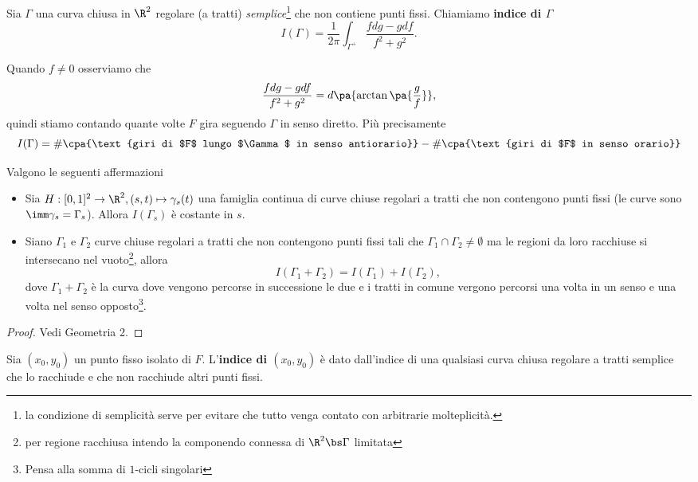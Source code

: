 \begin{definition}
Sia $\Gamma$ una curva chiusa in $\R^2$ regolare (a tratti) \textit{semplice}\footnote{la condizione di semplicit\`a serve per evitare che tutto venga contato con arbitrarie molteplicit\`a.} che non contiene punti fissi. Chiamiamo \textbf{indice di $\Gamma$}
\[I(\Gamma)=\frac1{2\pi}\int_{\Gamma^+}\frac{fdg-gdf}{f^2+g^2}.\]
\end{definition}
\begin{remark}
Quando $f\neq 0$ osserviamo che
\[\frac{fdg-gdf}{f^2+g^2}=d\pa{\arctan\pa{\frac gf}},\]
quindi stiamo contando quante volte $F$ gira seguendo $\Gamma$ in senso diretto. Pi\`u precisamente
\[I(\Gamma)=\#\cpa{\text{giri di $F$ lungo $\Gamma$ in senso antiorario}}-\#\cpa{\text{giri di $F$ in senso orario}}\]
\end{remark}


\setlength{\leftmargini}{0.5cm}
\begin{proposition}\label{ProprietaIndice}
Valgono le seguenti affermazioni
\begin{itemize}
\item Sia $H:[0,1]^2\to \R^2, (s,t)\mapsto \gamma_s(t)$ una famiglia continua di curve chiuse regolari a tratti che non contengono punti fissi (le curve sono $\imm\gamma_s=\Gamma_s$). Allora $I(\Gamma_s)$ \`e costante in $s$.
\item Siano $\Gamma_1$ e $\Gamma_2$ curve chiuse regolari a tratti che non contengono punti fissi tali che $\Gamma_1\cap \Gamma_2\neq \emptyset$ ma le regioni da loro racchiuse si intersecano nel vuoto\footnote{per regione racchiusa intendo la componendo connessa di $\R^2\bs \Gamma$ limitata}, allora
\[I(\Gamma_1+\Gamma_2)=I(\Gamma_1)+I(\Gamma_2),\]
dove $\Gamma_1+\Gamma_2$ \`e la curva dove vengono percorse in successione le due e i tratti in comune vergono percorsi una volta in un senso e una volta nel senso opposto\footnote{Pensa alla somma di $1$-cicli singolari}.
\end{itemize}
\end{proposition}
\begin{proof}
Vedi Geometria 2.
\end{proof}

\begin{definition}
Sia $(x_0,y_0)$ un punto fisso isolato di $F$. L'\textbf{indice di $(x_0,y_0)$} \`e dato dall'indice di una qualsiasi curva chiusa regolare a tratti semplice che lo racchiude e che non racchiude altri punti fissi.
\end{definition}

